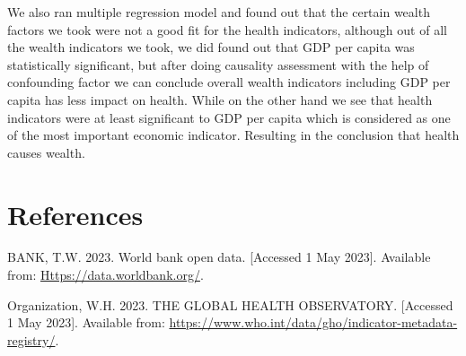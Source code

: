 \documentclass[
]{article}
\newlength{\cslhangindent}
\newlength{\cslentryspacingunit} %
\newenvironment{CSLReferences}[2] %
 {%
  \setlength{\parindent}{0pt}
  \ifodd #1
  \let\oldpar\par
  \def\par{\hangindent=\cslhangindent\oldpar}
  \fi
  \setlength{\parskip}{#2\cslentryspacingunit}
 }%
 {}
\begin{document}
We also ran multiple regression model and found out that the certain
wealth factors we took were not a good fit for the health indicators,
although out of all the wealth indicators we took, we did found out that
GDP per capita was statistically significant, but after doing causality
assessment with the help of confounding factor we can conclude overall
wealth indicators including GDP per capita has less impact on health.
While on the other hand we see that health indicators were at least
significant to GDP per capita which is considered as one of the most
important economic indicator. Resulting in the conclusion that health
causes wealth.

\hypertarget{references}{%
\section*{References}\label{references}}

\hypertarget{refs}{}
\begin{CSLReferences}{1}{0}
\leavevmode{}%
BANK, T.W. 2023. World bank open data. {[}Accessed 1 May 2023{]}.
Available from: \url{Https://data.worldbank.org/}.

\leavevmode{}%
Organization, W.H. 2023. THE GLOBAL HEALTH OBSERVATORY. {[}Accessed 1
May 2023{]}. Available from:
\url{https://www.who.int/data/gho/indicator-metadata-registry/}.

\end{CSLReferences}
\end{document}
